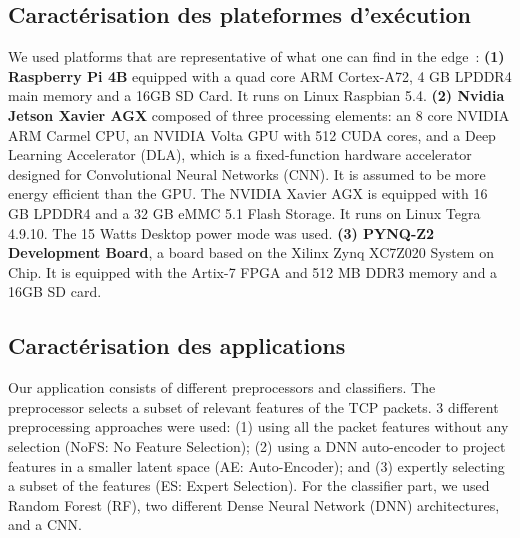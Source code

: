 \subsection{Caractérisation des plateformes d'exécution} \label{section:herocache-characterization-platforms}

We used platforms that are representative of what one can find in the edge~\cite{slimani:hal-04159551,kljucaric2020}: 
\textbf{(1) Raspberry Pi 4B} equipped with a quad core ARM Cortex-A72, 4 GB LPDDR4 main memory and a 16GB SD Card. It runs on Linux Raspbian 5.4.
\textbf{(2) Nvidia Jetson Xavier AGX} composed of three processing elements: an 8 core NVIDIA ARM Carmel CPU, an NVIDIA Volta GPU with 512 CUDA cores, and a Deep Learning Accelerator (DLA), which is a fixed-function hardware accelerator designed for Convolutional Neural Networks (CNN). It is assumed to be more energy efficient than the GPU. The NVIDIA Xavier AGX is equipped with 16 GB LPDDR4 and a 32 GB eMMC 5.1 Flash Storage. It runs on Linux Tegra 4.9.10. The 15 Watts Desktop power mode was used. 
\textbf{(3) PYNQ-Z2 Development Board}, a board based on the Xilinx Zynq XC7Z020 System on Chip. It is equipped with the Artix-7 FPGA and 512 MB DDR3 memory and a 16GB SD card.

\subsection{Caractérisation des applications}
\label{section:herocache-characterization-workloads}

Our application consists of different preprocessors and classifiers. The preprocessor selects a subset of relevant features of the TCP packets. 3 different preprocessing approaches were used: (1) using all the packet features without any selection (NoFS: No Feature Selection); (2) using a DNN auto-encoder to project features in a smaller latent space (AE: Auto-Encoder); and (3) expertly selecting a subset of the features (ES: Expert Selection). For the classifier part, we used Random Forest (RF), two different Dense Neural Network (DNN) architectures, and a CNN.

